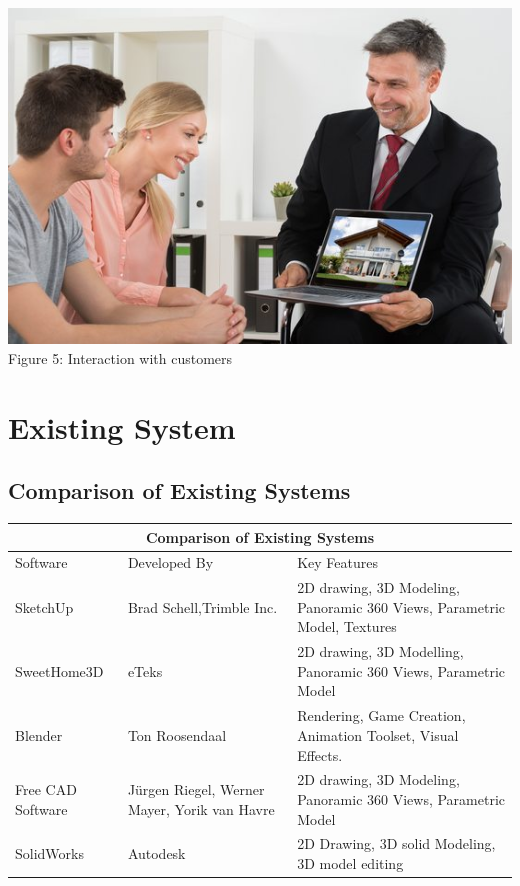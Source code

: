 \documentclass{article}
\begin{document}
\begin{itemize}
\begin{center}
\includegraphics[scale=0.4]{real}
\\Figure 5: Interaction with customers
\end{center}
\end{itemize}
\section{Existing System}
\subsection{Comparison of Existing Systems}



\setlength{\arrayrulewidth}{1mm}
\setlength{\tabcolsep}{9pt}
\renewcommand{\arraystretch}{1.7}

\begin{tabular}{ |p{2cm}|p{4cm}|p{6cm}| }
\hline
\multicolumn{3}{|c|}{Comparison of Existing Systems} \\
\hline
Software&Developed By&Key Features\\
\hline
SketchUp&Brad Schell,Trimble Inc.&2D drawing, 3D Modeling, Panoramic 360 Views, Parametric Model, Textures\\
\hline
SweetHome3D&eTeks &2D drawing, 3D Modelling, Panoramic 360 Views, Parametric Model\\
\hline
Blender&Ton Roosendaal&Rendering, Game Creation,
Animation Toolset, Visual Effects.
\\
\hline
Free CAD Software&Jürgen Riegel, Werner Mayer, Yorik van Havre&2D drawing, 3D Modeling, Panoramic 360 Views, Parametric Model\\
\hline
SolidWorks&Autodesk&2D Drawing, 3D solid Modeling, 3D model editing\\
\hline
\end{tabular}
\end{document}
